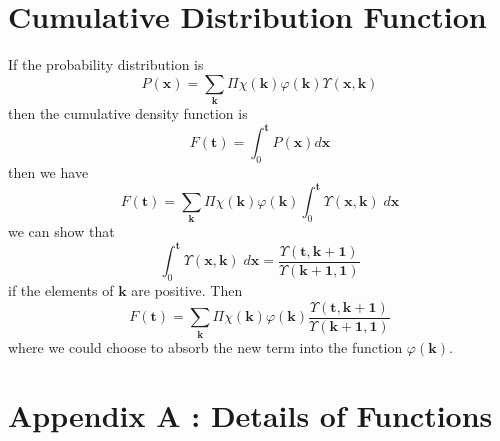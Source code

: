 \documentclass[journal=jcisd8,manuscript=article,layout=onecolumn,pdftex,floatfix,amsmath,amssymb,10pt]{achemso}
\begin{document}
\section{Cumulative Distribution Function}
If the probability distribution is
\begin{equation}
P(\mathbf{x})  = \sum_{\mathbf{k}} \Pi \chi(\mathbf{k}) \varphi(\mathbf{k}) \Upsilon(\mathbf{x},\mathbf{k})
\end{equation}
then the cumulative density function is 
\begin{equation}
F(\mathbf{t}) = \int_0^\mathbf{t} P(\mathbf{x})d \mathbf{x}
\end{equation}
then we have
\begin{equation}
F(\mathbf{t})  = \sum_{\mathbf{k}} \Pi \chi(\mathbf{k}) \varphi(\mathbf{k}) \int_0^\mathbf{t} \Upsilon(\mathbf{x},\mathbf{k}) \; d\mathbf{x}
\end{equation}
we can show that
\begin{equation}
\int_0^\mathbf{t} \Upsilon(\mathbf{x},\mathbf{k}) \; d\mathbf{x} = \frac{\Upsilon(\mathbf{t},\mathbf{k}+\mathbf{1})}{\Upsilon(\mathbf{k}+\mathbf{1},\mathbf{1})}
\end{equation}
if the elements of $\mathbf{k}$ are positive. Then 
\begin{equation}
F(\mathbf{t})  = \sum_{\mathbf{k}} \Pi \chi(\mathbf{k}) \varphi(\mathbf{k}) \frac{\Upsilon(\mathbf{t},\mathbf{k}+\mathbf{1})}{\Upsilon(\mathbf{k}+\mathbf{1},\mathbf{1})}
\end{equation}
where we could choose to absorb the new term into the function $\varphi(\mathbf{k})$.



\section{Appendix A : Details of Functions}
\end{document}
